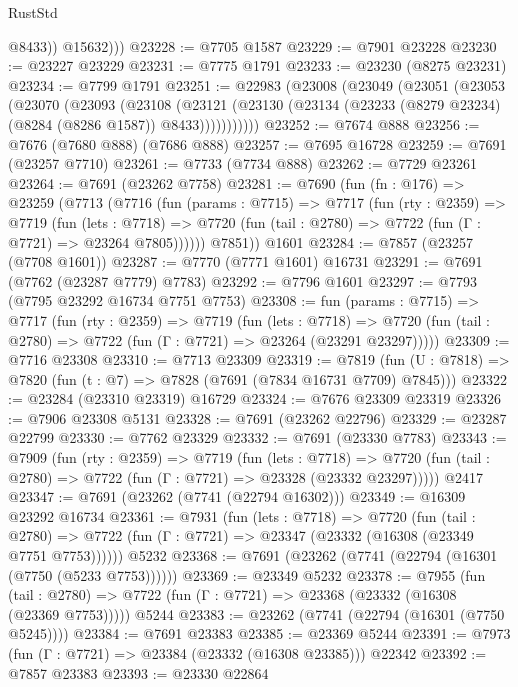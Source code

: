 \begin{lexlean}{RustStd}
\begin{coremodule}
              @8433))
          @15632)))
@23228 := @7705 @1587
@23229 := @7901 @23228
@23230 := @23227 @23229
@23231 := @7775 @1791
@23233 := @23230 (@8275 @23231)
@23234 := @7799 @1791
@23251 := @22983
    (@23008
      (@23049
        (@23051
          (@23053
            (@23070
              (@23093
                (@23108
                  (@23121
                    (@23130 (@23134 (@23233 (@8279 @23234) (@8284 (@8286 @1587)) @8433)))))))))))
@23252 := @7674 @888
@23256 := @7676 (@7680 @888) (@7686 @888)
@23257 := @7695 @16728
@23259 := @7691 (@23257 @7710)
@23261 := @7733 (@7734 @888)
@23262 := @7729 @23261
@23264 := @7691 (@23262 @7758)
@23281 := @7690
    (fun (fn : @176) =>
    @23259
      (@7713
        (@7716
          (fun (params : @7715) =>
          @7717
            (fun (rty : @2359) =>
            @7719
              (fun (lets : @7718) =>
              @7720 (fun (tail : @2780) => @7722 (fun (Γ : @7721) => @23264 @7805))))))
        @7851))
    @1601
@23284 := @7857 (@23257 (@7708 @1601))
@23287 := @7770 (@7771 @1601) @16731
@23291 := @7691 (@7762 (@23287 @7779) @7783)
@23292 := @7796 @1601
@23297 := @7793 (@7795 @23292 @16734 @7751 @7753)
@23308 := fun (params : @7715) =>
  @7717
    (fun (rty : @2359) =>
    @7719
      (fun (lets : @7718) =>
      @7720 (fun (tail : @2780) => @7722 (fun (Γ : @7721) => @23264 (@23291 @23297)))))
@23309 := @7716 @23308
@23310 := @7713 @23309
@23319 := @7819
    (fun (U : @7818) => @7820 (fun (t : @7) => @7828 (@7691 (@7834 @16731 @7709) @7845)))
@23322 := @23284 (@23310 @23319) @16729
@23324 := @7676 @23309 @23319
@23326 := @7906 @23308 @5131
@23328 := @7691 (@23262 @22796)
@23329 := @23287 @22799
@23330 := @7762 @23329
@23332 := @7691 (@23330 @7783)
@23343 := @7909
    (fun (rty : @2359) =>
    @7719
      (fun (lets : @7718) =>
      @7720 (fun (tail : @2780) => @7722 (fun (Γ : @7721) => @23328 (@23332 @23297)))))
    @2417
@23347 := @7691 (@23262 (@7741 (@22794 @16302)))
@23349 := @16309 @23292 @16734
@23361 := @7931
    (fun (lets : @7718) =>
    @7720
      (fun (tail : @2780) =>
      @7722 (fun (Γ : @7721) => @23347 (@23332 (@16308 (@23349 @7751 @7753))))))
    @5232
@23368 := @7691 (@23262 (@7741 (@22794 (@16301 (@7750 (@5233 @7753))))))
@23369 := @23349 @5232
@23378 := @7955
    (fun (tail : @2780) => @7722 (fun (Γ : @7721) => @23368 (@23332 (@16308 (@23369 @7753)))))
    @5244
@23383 := @23262 (@7741 (@22794 (@16301 (@7750 @5245))))
@23384 := @7691 @23383
@23385 := @23369 @5244
@23391 := @7973 (fun (Γ : @7721) => @23384 (@23332 (@16308 @23385))) @22342
@23392 := @7857 @23383
@23393 := @23330 @22864

\end{coremodule}
\end{lexlean}
